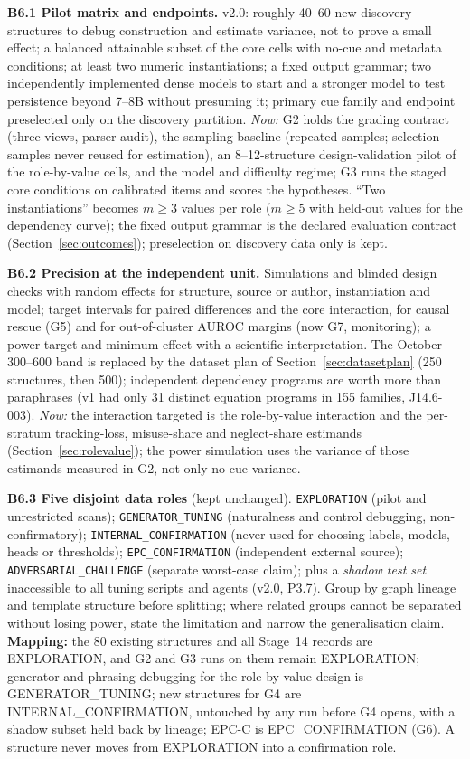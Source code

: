\documentclass[10pt,a4paper]{article}
\begin{document}
\textbf{B6.1 Pilot matrix and endpoints.} v2.0: roughly 40--60 new discovery structures to debug construction and
estimate variance, not to prove a small effect; a balanced attainable subset of the core cells with no-cue and
metadata conditions; at least two numeric instantiations; a fixed output grammar; two independently implemented
dense models to start and a stronger model to test persistence beyond 7--8B without presuming it; primary cue
family and endpoint preselected only on the discovery partition. \emph{Now:} G2 holds the grading contract (three
views, parser audit), the sampling baseline (repeated samples; selection samples never reused for estimation), an
8--12-structure design-validation pilot of the role-by-value cells, and the model and difficulty regime; G3 runs
the staged core conditions on calibrated items and scores the hypotheses. ``Two instantiations'' becomes
$m\geq3$ values per role ($m\geq5$ with held-out values for the dependency curve); the fixed output grammar is the
declared evaluation contract (Section~\ref{sec:outcomes}); preselection on discovery data only is kept.

\textbf{B6.2 Precision at the independent unit.} Simulations and blinded design checks with random effects for
structure, source or author, instantiation and model; target intervals for paired differences and the core
interaction, for causal rescue (G5) and for out-of-cluster AUROC margins (now G7, monitoring); a power target and
minimum effect with a scientific interpretation. The October 300--600 band is replaced by the dataset plan of
Section~\ref{sec:datasetplan} (250 structures, then 500); independent dependency programs are worth more than paraphrases (v1 had only 31 distinct
equation programs in 155 families, J14.6-003). \emph{Now:} the interaction targeted is the role-by-value interaction
and the per-stratum tracking-loss, misuse-share and neglect-share estimands (Section~\ref{sec:rolevalue}); the power simulation
uses the variance of those estimands measured in G2, not only no-cue variance.

\textbf{B6.3 Five disjoint data roles} (kept unchanged). \texttt{EXPLORATION} (pilot and unrestricted scans);
\texttt{GENERATOR\_TUNING} (naturalness and control debugging, non-confirmatory); \texttt{INTERNAL\_CONFIRMATION}
(never used for choosing labels, models, heads or thresholds); \texttt{EPC\_CONFIRMATION} (independent external
source); \texttt{ADVERSARIAL\_CHALLENGE} (separate worst-case claim); plus a \emph{shadow test set} inaccessible to
all tuning scripts and agents (v2.0, P3.7). Group by graph lineage and template structure before splitting; where
related groups cannot be separated without losing power, state the limitation and narrow the generalisation claim.
\textbf{Mapping:} the 80 existing structures and all Stage~14 records are EXPLORATION, and G2 and G3 runs on them
remain EXPLORATION; generator and phrasing debugging for the role-by-value design is GENERATOR\_TUNING; new
structures for G4 are INTERNAL\_CONFIRMATION, untouched by any run before G4 opens, with a shadow subset held back by
lineage; EPC-C is EPC\_CONFIRMATION (G6). A structure never moves from EXPLORATION into a confirmation role.
\end{document}
